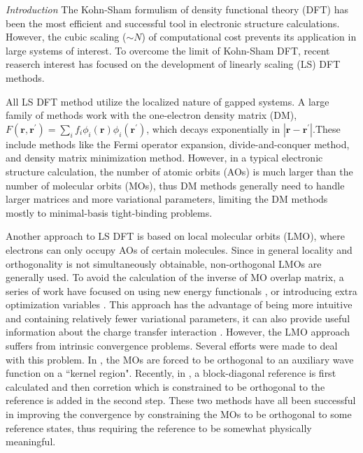 \documentclass[prl,twocolumn,showpacs]{revtex4}
\begin{document}
\emph{Introduction} 
The Kohn-Sham formulism of density functional theory (DFT)\cite{hohenberg1964inhomogeneous,kohn1965self} has been the most efficient and successful tool in electronic structure calculations. However, the cubic scaling ($\sim N$) of computational cost prevents its application in large systems of interest. To overcome the limit of Kohn-Sham DFT, recent reaserch interest has focused on the development of linearly scaling (LS) DFT methods\cite{bowler2012methods,goedecker1999linear}. 

All LS DFT method utilize the localized nature of gapped systems. A large family of methods work with the one-electron density matrix (DM)\cite{li1993density,lee1996linear,li2003density,vandevondele2012linear}, $F(\mathbf{r},\mathbf{r}^{'})=\sum_i f_i \phi_i(\mathbf{r}) \phi_i(\mathbf{r}^{'})$, which decays exponentially in $|\mathbf{r}-\mathbf{r}^{'}|$.These include methods like the Fermi operator expansion\cite{goedecker1994efficient,goedecker1995tight}, divide-and-conquer method\cite{yang1991direct,yang1991local}, and density matrix minimization method\cite{li1993density}. However, in a typical electronic structure calculation, the number of atomic orbits (AOs) is much larger than the number of molecular orbits (MOs), thus DM methods generally need to handle larger matrices and more variational parameters, limiting the DM methods mostly to minimal-basis tight-binding problems. 

Another approach to LS DFT is based on local molecular orbits (LMO), where electrons can only occupy AOs of certain molecules. Since in general locality and orthogonality is not simultaneously obtainable, non-orthogonal LMOs are generally used. To avoid the calculation of the inverse of MO overlap matrix, a series of work have focused on using new energy functionals \cite{mauri1993orbital,kim1995total,ordejon1995linear}, or introducing extra optimization variables \cite{burger2008linear,peng2013effective}. This approach has the advantage of being more intuitive and containing relatively fewer variational parameters, it can also provide useful information about the charge transfer interaction \cite{khaliullin2007unravelling,khaliullin2008analysis}. However, the LMO approach suffers from intrinsic convergence problems\cite{ordejon1995linear,fattebert2004linear}. Several efforts were made to deal with this problem. In \cite{tsuchida2007augmented,tsuchida2008ab}, the MOs are forced to be orthogonal to an auxiliary wave function on a ``kernel region". Recently, in \cite{khaliullin2013efficient}, a block-diagonal reference is first calculated and then corretion which is constrained to be orthogonal to the reference is added in the second step. These two methods have all been successful in improving the convergence by constraining the MOs to be orthogonal to some reference states, thus requiring the reference to be somewhat physically meaningful.
\end{document}
